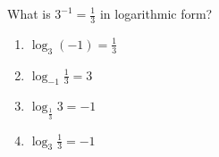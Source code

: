 \bigskip

\item What is $\displaystyle 3^{-1}=\frac{1}{3}$ in logarithmic form?

\begin{enumerate}
\item $\displaystyle \log_3 (-1)=\frac{1}{3}$
\item $\displaystyle \log_{-1} \frac{1}{3}=3$
\item $\displaystyle \log_{\frac{1}{3}} 3=-1$
\item $\displaystyle \log_3 \frac{1}{3}=-1$
\end{enumerate}




